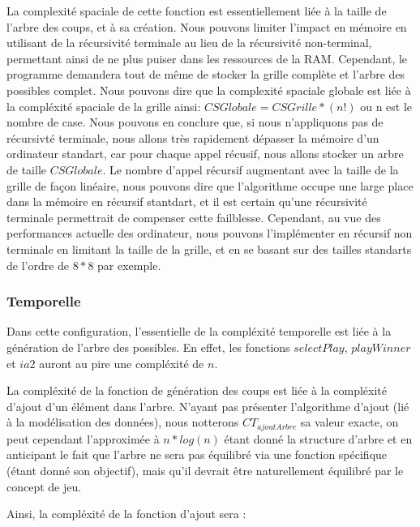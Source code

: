 \documentclass[a4paper,12pt]{report}
\begin{document}
La complexit\'e spaciale de cette fonction est essentiellement li\'ee \`a la taille de l'arbre des coups, et \`a sa cr\'eation. Nous pouvons limiter l'impact en m\'emoire en utilisant de la r\'ecursivit\'e terminale au lieu de la r\'ecursivit\'e non-terminal, permettant ainsi de ne plus puiser dans les ressources de la RAM. Cependant, le programme demandera tout de m\^eme de stocker la grille compl\`ete et l'arbre des possibles complet. Nous pouvons dire que la complexit\'e spaciale globale est li\'ee \`a la compl\'exit\'e spaciale de la grille ainsi: $CSGlobale=CSGrille*(n!)$ ou n est le nombre de case. Nous pouvons en conclure que, si nous n'appliquons pas de r\'ecursivt\'e terminale, nous allons tr\`es rapidement d\'epasser la m\'emoire d'un ordinateur standart, car pour chaque appel r\'ecusif, nous allons stocker un arbre de taille $CSGlobale$. Le nombre d'appel r\'ecursif augmentant avec la taille de la grille de fa\c{c}on lin\'eaire, nous pouvons dire que l'algorithme occupe une large place dans la m\'emoire en r\'ecursif stantdart, et il est certain qu'une r\'ecursivit\'e terminale permettrait de compenser cette failblesse. Cependant, au vue des performances actuelle des ordinateur, nous pouvons l'impl\'ementer en r\'ecursif non terminale en limitant la taille de la grille, et en se basant sur des tailles \og{}standarts\fg{} de l'ordre de $8*8$ par exemple.

\subsubsection{Temporelle}

Dans cette configuration, l'essentielle de la compl\'exit\'e temporelle est li\'ee \`a la g\'en\'eration de l'arbre des possibles. En effet, les fonctions $selectPlay$, $playWinner$ et $ia2$ auront au pire une compl\'exit\'e de $n$. 

La compl\'exit\'e de la fonction de g\'en\'eration des coups est li\'ee \`a la compl\'exit\'e d'ajout d'un \'el\'ement dans l'arbre. N'ayant pas pr\'esenter l'algorithme d'ajout (li\'e \`a la mod\'elisation des donn\'ees), nous notterons $CT_{ajoutArbre}$ sa valeur exacte, on peut cependant l'approxim\'ee \`a $n*log(n)$ \'etant donn\'e la structure d'arbre et en anticipant le fait que l'arbre ne sera pas \'equilibr\'e via une fonction sp\'ecifique (\'etant donn\'e son objectif), mais qu'il devrait \^etre naturellement \'equilibr\'e par le concept de jeu.

Ainsi, la compl\'exit\'e de la fonction d'ajout sera : 
\end{document}

